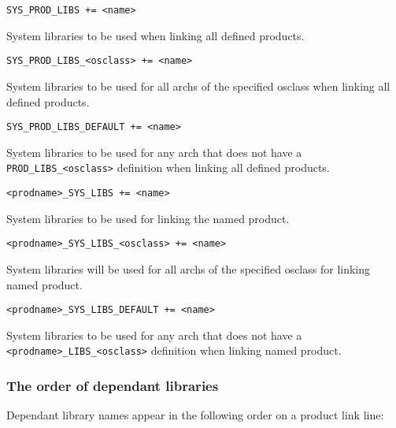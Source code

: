 \begin{description}
\item {}\verb|SYS_PROD_LIBS += <name>|

System libraries to be used when linking all defined products.

\item \verb|SYS_PROD_LIBS_<osclass> += <name>|

System libraries to be used for all archs of the specified osclass when linking all defined products.

\item \verb|SYS_PROD_LIBS_DEFAULT += <name>|

System libraries to be used for any arch that does not have a \verb|PROD_LIBS_<osclass>| definition when 
linking all defined products.

\item {}\verb|<prodname>_SYS_LIBS += <name>|

System libraries to be used for linking the named product.

\item

\item \verb|<prodname>_SYS_LIBS_<osclass> += <name>|

System libraries will be used for all archs of the specified osclass for linking named product.

\item \verb|<prodname>_SYS_LIBS_DEFAULT += <name>|

System libraries to be used for any arch that does not have a \verb|<prodname>_LIBS_<osclass>| definition when 
linking named product.

\end{description}

\subsubsection{The order of dependant libraries}

Dependant library names appear in the following order on a product link line:

